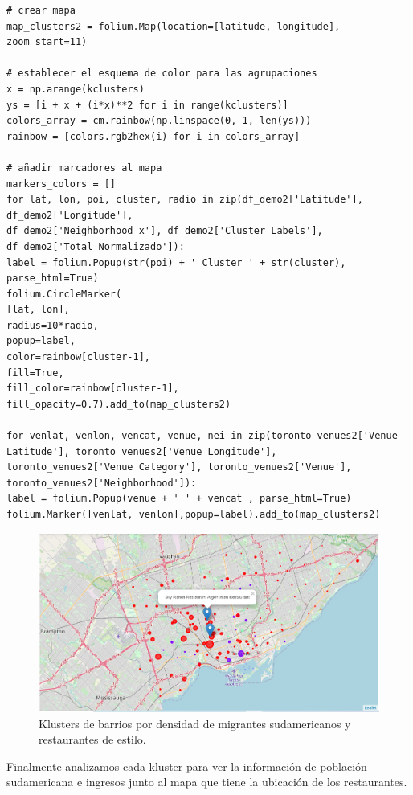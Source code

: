 \documentclass[10pt,a4paper,arial, spanish]{article}
\begin{document}
\begin{verbatim}
# crear mapa
map_clusters2 = folium.Map(location=[latitude, longitude], zoom_start=11)

# establecer el esquema de color para las agrupaciones
x = np.arange(kclusters)
ys = [i + x + (i*x)**2 for i in range(kclusters)]
colors_array = cm.rainbow(np.linspace(0, 1, len(ys)))
rainbow = [colors.rgb2hex(i) for i in colors_array]

# añadir marcadores al mapa
markers_colors = []
for lat, lon, poi, cluster, radio in zip(df_demo2['Latitude'], df_demo2['Longitude'],
df_demo2['Neighborhood_x'], df_demo2['Cluster Labels'], df_demo2['Total Normalizado']):
label = folium.Popup(str(poi) + ' Cluster ' + str(cluster), parse_html=True)
folium.CircleMarker(
[lat, lon],
radius=10*radio,
popup=label,
color=rainbow[cluster-1],
fill=True,
fill_color=rainbow[cluster-1],
fill_opacity=0.7).add_to(map_clusters2)

for venlat, venlon, vencat, venue, nei in zip(toronto_venues2['Venue Latitude'], toronto_venues2['Venue Longitude'],
toronto_venues2['Venue Category'], toronto_venues2['Venue'], 
toronto_venues2['Neighborhood']):
label = folium.Popup(venue + ' ' + vencat , parse_html=True)
folium.Marker([venlat, venlon],popup=label).add_to(map_clusters2) 
\end{verbatim}
\begin{figure}[H]
	\centering
	\includegraphics[scale=0.45]{map4}
	\caption[Klusters de barrios por densidad de migrantes sudamericanos y restaurantes de estilo.]{Klusters de barrios por densidad de migrantes sudamericanos y restaurantes de estilo.}
	\label{fig:map4}
\end{figure}
Finalmente analizamos cada kluster para ver la información de población sudamericana e ingresos junto al mapa que tiene la ubicación de los restaurantes.
\end{document}
